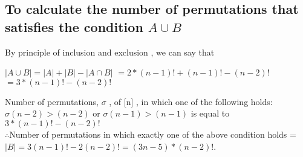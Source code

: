 \documentclass[]{article}
\begin{document}
\subsection{ To calculate the number of permutations that satisfies the condition $A \cup B $ }
By principle of inclusion and exclusion , we can say that 
\begin{center}
$|A \cup B| = |A| + |B| - |A \cap B| $
$= 2*(n-1)! + (n-1)! - (n-2)! $\\
$= 3*(n-1)! - (n-2)! $
\end{center}
Number of  permutations, $\sigma$ , of [n] , in which one of the following holds: $\sigma(n - 2) > (n - 2)$ or $\sigma(n - 1) > (n - 1) $ is equal to $ 3*(n-1)! - (n-2)! $\\
$\therefore$Number of permutations in which exactly one of the above condition holds = $|B| = 3(n - 1)! - 2(n - 2)! = (3n - 5) * (n-2)!$.
\end{document}
